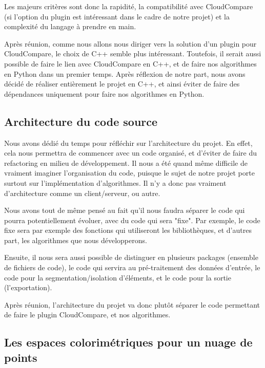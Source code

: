\documentclass[12pt,titlepage,french]{article}
\begin{document}
Les majeurs critères sont donc la rapidité, la compatibilité avec CloudCompare (si l'option du plugin est intéressant dans le cadre de notre projet) et la complexité du langage à prendre en main.

Après réunion, comme nous allons nous diriger vers la solution d'un plugin pour CloudCompare, le choix de C++ semble plus intéressant. Toutefois, il serait aussi possible de faire le lien avec CloudCompare en C++, et de faire nos algorithmes en Python dans un premier temps. Après réflexion de notre part, nous avons décidé de réaliser entièrement le projet en C++, et ainsi éviter de faire des dépendances uniquement pour faire nos algorithmes en Python.

\subsection{Architecture du code source}

Nous avons dédié du temps pour réfléchir sur l'architecture du projet. En effet, cela nous permettra de commencer avec un code organisé, et d'éviter de faire du refactoring en milieu de développement. Il nous a été quand même difficile de vraiment imaginer l'organisation du code, puisque le sujet de notre projet porte surtout sur l'implémentation d'algorithmes. Il n'y a donc pas vraiment d'architecture comme un client/serveur, ou autre.

Nous avons tout de même pensé au fait qu'il nous faudra séparer le code qui pourra potentiellement évoluer, avec du code qui sera "fixe". Par exemple, le code fixe sera par exemple des fonctions qui utiliseront les bibliothèques, et d'autres part, les algorithmes que nous développerons.

Ensuite, il nous sera aussi possible de distinguer en plusieurs packages (ensemble de fichiers de code), le code qui servira au pré-traitement des données d'entrée, le code pour la segmentation/isolation d'éléments, et le code pour la sortie (l'exportation).

Après réunion, l'architecture du projet va donc plutôt séparer le code permettant de faire le plugin CloudCompare, et nos algorithmes.

\subsection{Les espaces colorimétriques pour un nuage de points}
\end{document}
